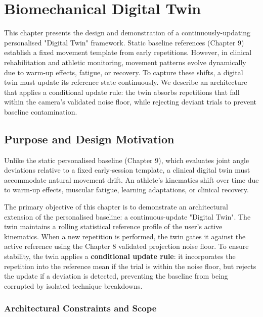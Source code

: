 \chapter{Biomechanical Digital Twin}
\label{ch:twin}



This chapter presents the design and demonstration of a continuously-updating personalised "Digital Twin" framework. Static baseline references (Chapter 9) establish a fixed movement template from early repetitions. However, in clinical rehabilitation and athletic monitoring, movement patterns evolve dynamically due to warm-up effects, fatigue, or recovery. To capture these shifts, a digital twin must update its reference state continuously. We describe an architecture that applies a conditional update rule: the twin absorbs repetitions that fall within the camera's validated noise floor, while rejecting deviant trials to prevent baseline contamination.



\section{Purpose and Design Motivation}
\label{sec:11-1-purpose-and-design-motivation}


Unlike the static personalised baseline (Chapter 9), which evaluates joint angle deviations relative to a fixed early-session template, a clinical digital twin must accommodate natural movement drift. An athlete's kinematics shift over time due to warm-up effects, muscular fatigue, learning adaptations, or clinical recovery.

The primary objective of this chapter is to demonstrate an architectural extension of the personalised baseline: a continuous-update "Digital Twin". The twin maintains a rolling statistical reference profile of the user's active kinematics. When a new repetition is performed, the twin gates it against the active reference using the Chapter 8 validated projection noise floor. To ensure stability, the twin applies a \textbf{conditional update rule}: it incorporates the repetition into the reference mean if the trial is within the noise floor, but rejects the update if a deviation is detected, preventing the baseline from being corrupted by isolated technique breakdowns.

\subsection{Architectural Constraints and Scope}
\label{sec:11-1-1-architectural-constraints-and-scope}

